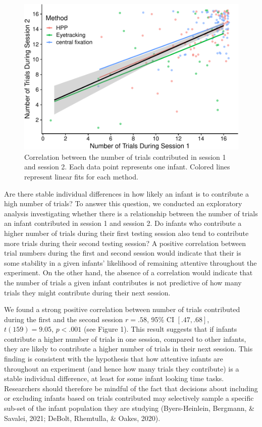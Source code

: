 \documentclass[
  man, donotrepeattitle,floatsintext]{apa6}
\begin{document}
\begin{figure}
\centering
\includegraphics{MB1T_supplement_files/figure-latex/sfig7-1.pdf}
\caption{\label{fig:sfig7}Correlation between the number of trials contributed in session 1 and session 2. Each data point represents one infant. Colored lines represent linear fits for each method.}
\end{figure}

Are there stable individual differences in how likely an infant is to contribute a high number of trials?
To answer this question, we conducted an exploratory analysis investigating whether there is a relationship between the number of trials an infant contributed in session 1 and session 2.
Do infants who contribute a higher number of trials during their first testing session also tend to contribute more trials during their second testing session?
A positive correlation between trial numbers during the first and second session would indicate that their is some stability in a given infants' likelihood of remaining attentive throughout the experiment.
On the other hand, the absence of a correlation would indicate that the number of trials a given infant contributes is not predictive of how many trials they might contribute during their next session.

We found a strong positive correlation between number of trials contributed during the first and the second session \(r = .58\), 95\% CI \([.47, .68]\), \(t(159) = 9.05\), \(p < .001\) (see Figure 1).
This result suggests that if infants contribute a higher number of trials in one session, compared to other infants, they are likely to contribute a higher number of trials in their next session.
This finding is consistent with the hypothesis that how attentive infants are throughout an experiment (and hence how many trials they contribute) is a stable individual difference, at least for some infant looking time tasks.
Researchers should therefore be mindful of the fact that decisions about including or excluding infants based on trials contributed may selectively sample a specific sub-set of the infant population they are studying (Byers-Heinlein, Bergmann, \& Savalei, 2021; DeBolt, Rhemtulla, \& Oakes, 2020).
\end{document}

